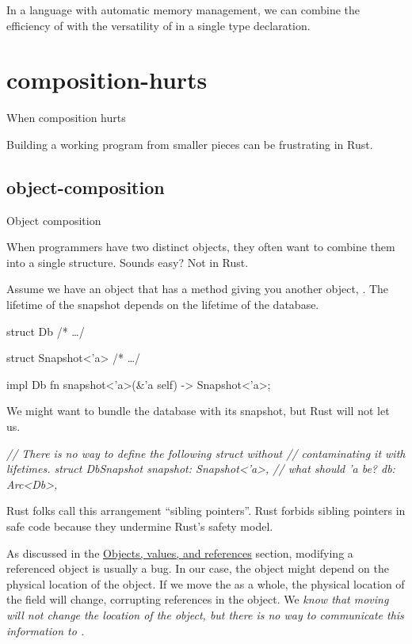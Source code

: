 \documentclass{article}
\begin{document}
In a language with automatic memory management, we can combine the efficiency of  with the versatility of  in a single type declaration.

\section{composition-hurts}{When composition hurts}

Building a working program from smaller pieces can be frustrating in Rust.

\subsection{object-composition}{Object composition}

When programmers have two distinct objects, they often want to combine them into a single structure.
Sounds easy? Not in Rust.

Assume we have an object  that has a method giving you another object, .
The lifetime of the snapshot depends on the lifetime of the database.

\begin{code}[rust]
struct Db { /* \ldots  */ }

struct Snapshot<'a> { /* \ldots  */ }

impl Db { fn snapshot<'a>(&'a self) -> Snapshot<'a>; }
\end{code}

We might want to bundle the database with its snapshot, but Rust will not let us.

\begin{code}[bad]
\em{// There is no way to define the following struct without}
\em{// contaminating it with lifetimes.}
struct DbSnapshot {
  snapshot: Snapshot<'a>, \em{// what should 'a be?}
  db: Arc<Db>,
}
\end{code}

Rust folks call this arrangement ``sibling pointers''.
Rust forbids sibling pointers in safe code because they undermine Rust's safety model.

As discussed in the \href{#objects-values-references}{Objects, values, and references} section, modifying a referenced object is usually a bug.
In our case, the  object might depend on the physical location of the  object.
If we move the  as a whole, the physical location of the  field will change, corrupting references in the  object.
We \em{know} that moving  will not change the location of the  object, but there is no way to communicate this information to .
\end{document}
